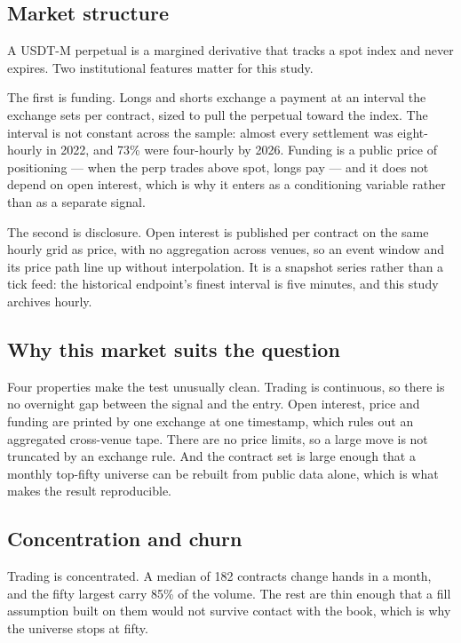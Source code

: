 \documentclass[11pt,a4paper]{article}
\begin{document}
\subsection{Market structure}

A USDT-M perpetual is a margined derivative that tracks a spot index and never expires. Two institutional features matter for this study.

The first is funding. Longs and shorts exchange a payment at an interval the exchange sets per contract, sized to pull the perpetual toward the index. The interval is not constant across the sample: almost every settlement was eight-hourly in 2022, and 73\% were four-hourly by 2026. Funding is a public price of positioning --- when the perp trades above spot, longs pay --- and it does not depend on open interest, which is why it enters as a conditioning variable rather than as a separate signal.

The second is disclosure. Open interest is published per contract on the same hourly grid as price, with no aggregation across venues, so an event window and its price path line up without interpolation. It is a snapshot series rather than a tick feed: the historical endpoint's finest interval is five minutes, and this study archives hourly.

\subsection{Why this market suits the question}

Four properties make the test unusually clean. Trading is continuous, so there is no overnight gap between the signal and the entry. Open interest, price and funding are printed by one exchange at one timestamp, which rules out an aggregated cross-venue tape. There are no price limits, so a large move is not truncated by an exchange rule. And the contract set is large enough that a monthly top-fifty universe can be rebuilt from public data alone, which is what makes the result reproducible.

\subsection{Concentration and churn}

Trading is concentrated. A median of 182 contracts change hands in a month, and the fifty largest carry 85\% of the volume. The rest are thin enough that a fill assumption built on them would not survive contact with the book, which is why the universe stops at fifty.
\end{document}
